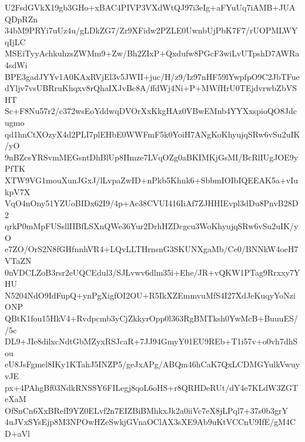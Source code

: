 U2FsdGVkX19gb3GHo+xBAC4PIVP3VXdWtQJ97i3eIg+aFYuUq7iAMB+JUAQDpRZn
34bM9PRYi7uUz4u/gLDkZG7/Zr9XFidw2PZLE0UwnbUjPbK7F7/rUOPMLWYqIjLC
MSEiTyyAchkuhzsZWMm9+Zw/Bh2ZIxP+Qxdufw8PGcF3wiLvUTpshD7AWRa4sdWi
BPE3gadJYYv1A0KAxRVjEl3v5JWII+juc/H/z9/Iz97nHF59lYwpfpO9C2JbTFue
dYljv7vsUBRruKhqxv8rQhaIXJvBc8A/ffdWj4Ni+P+MWfHrU0TEjdvrwbZbVSHT
Sc+F8Nu57r2/c372wsEoYddwqDVOrXxKkgHAz0VBwEMnb4YYXxspioQO8Jdcugmo
qd1hnCtXOzyX4d2PLI7plEHbE0WWFmF5k0YoiH7ANgKoKhyujqSRw6vSu2uIK/yO
9nBZcsYRSvmMEGsntDhBlUp8Hmze7LVqOZg0aBKIMKjGsMI/BcRlIUgJOE9yPfTK
XTW9VG1mouXunJGxJ/lLvpaZwID+nPkb5Khnk6+SbbmIOIbIQEEAK5a+vIukpV7X
VqO4nOny51YZUoBIDx62I9/4p+Ac38CVUI416IiAf7ZJHHIEvpl3dDu8PnvB28D2
qrkP0mMpFUSsllIIBfLSXnQWe36Yur2DrhHZDcgcu3WoKhyujqSRw6vSu2uIK/yO
e7ZO/OrS2N8fGHfnnhVR4+LQvLLTHrnsnG3SKUNXgaMb/Ce0/BNNkW4oeH7VTaZN
0nVDCLZoB3rsr2eUQCEdul3/SJLvwv6dlm35i+Ehe/JR+vQKW1PTag9Rrxxy7YHU
N5204NdO9IdFupQ+ynPgXigfOI2OU+R5IkXZEmmvuMfS4I27XdJeKuqyYoNziONP
QBtK1fou15HkV4+Rvdpcmb3yCjZkkyrOpp0l363RgBMTksh0YwMcB+BuuuES//5c
DL9+JIe8dilxcNdtGbMZyxRSJcaR+7JJ94GmyY01EU9REb+T1i57v+o0vh7dhSou
eU8JsFgmel8IKy1KTahJ5INZP5/geJxAPg/ABQm46hCaK7QxLCDMGYulkVwuyvJE
px+4PAhgBf03NdkRNSSY6FILegj8qoL6oHS+r8QRHDeRUt/dY4e7KLdW3ZGTeXaM
OfSnCn6XxBRefI9YZ0ELvf2n7EIZBiBMhkxJk2a0iiVc7eX8jLPql7+37s0b3grY
4uJVxSYsEjp8M3NPOwHZeSwkjGVnaOClAX3sXE9Ab9uKtVCCnU9IfE/gM4CD+aVl
